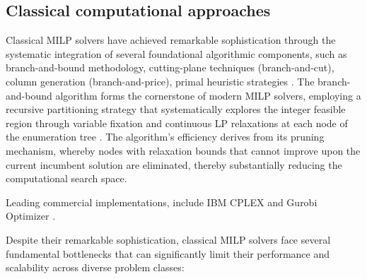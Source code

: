 \documentclass{oqireport}
\begin{document}
\subsection{Classical computational approaches \cite{CLAUTIAUX2025707}}
\label{sub:classical}




Classical MILP solvers have achieved remarkable sophistication through the systematic integration of several foundational algorithmic components, such as branch-and-bound methodology, cutting-plane techniques (branch-and-cut), column generation (branch-and-price), primal heuristic strategies \cite{nemhauser1988integer, nemhauser1999integer}. The branch-and-bound algorithm forms the cornerstone of modern MILP solvers, employing a recursive partitioning strategy that systematically explores the integer feasible region through variable fixation and continuous LP relaxations at each node of the enumeration tree \cite{achterberg2007constraint, wolsey1998integer}. The algorithm's efficiency derives from its pruning mechanism, whereby nodes with relaxation bounds that cannot improve upon the current incumbent solution are eliminated, thereby substantially reducing the computational search space.


Leading commercial implementations, include IBM CPLEX and Gurobi Optimizer \cite{cplex2023, gurobi2023}.

Despite their remarkable sophistication, classical MILP solvers face several fundamental bottlenecks that can significantly limit their performance and scalability across diverse problem classes:
\end{document}
